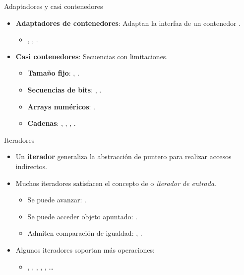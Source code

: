 \begin{frame}[t]{Adaptadores y casi contenedores}
\begin{itemize}
  \item \textbf{Adaptadores de contenedores}: Adaptan la interfaz de un contenedor .
    \begin{itemize}
      \item {}, , .
    \end{itemize}
  \item \textbf{Casi contenedores}: Secuencias con limitaciones.
    \begin{itemize}
      \item \textbf{Tamaño fijo}: , .
      \item \textbf{Secuencias de bits}: , .
      \item \textbf{Arrays numéricos}: .
      \item \textbf{Cadenas}: , , ,
            .
    \end{itemize}
\end{itemize}
\end{frame}

\begin{frame}[t]{Iteradores}
\begin{itemize}
  \item Un \textbf{iterador} generaliza la abstracción de puntero para realizar
        accesos indirectos.
  \item Muchos iteradores satisfacen el concepto de  o
        \emph{iterador de entrada}.
    \begin{itemize}
      \item Se puede avanzar: .
      \item Se puede acceder objeto apuntado: .
      \item Admiten comparación de igualdad: , .
    \end{itemize}
  \item Algunos iteradores soportan más operaciones:
    \begin{itemize}
      \item {}, , , , , \ldots
    \end{itemize}
\end{itemize}
\end{frame}


